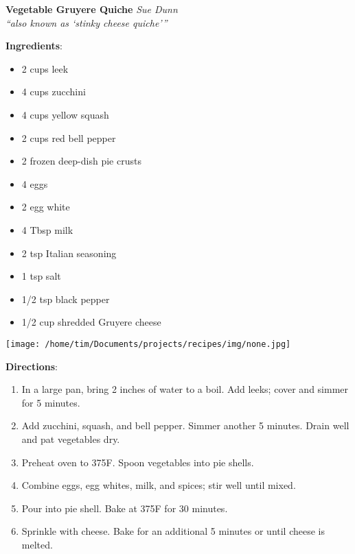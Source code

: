 \documentclass[11pt, twoside, openany]{book}
\begin{document}
\noindent\begin{minipage}[t]{\linewidth}%
{\Large\textbf{Vegetable Gruyere Quiche}} \label{vegetable-gruyere-quiche}\hfill\textit{Sue Dunn}\\
\textit{``also known as `stinky cheese quiche'''}\\
\noindent\begin{minipage}[t]{0.78\linewidth}%
\textbf{Ingredients}:\vspace{-3mm}
\begin{multicols}{2}
\begin{itemize}\setlength\itemsep{-1mm}
\item 2 cups leek
\item 4 cups zucchini
\item 4 cups yellow squash
\item 2 cups red bell pepper
\item 2 frozen deep-dish pie crusts
\item 4 eggs
\item 2 egg white
\item 4 Tbsp milk
\item 2 tsp Italian seasoning
\item 1 tsp salt
\item 1/2 tsp black pepper
\item 1/2 cup shredded Gruyere cheese
\end{itemize}
\end{multicols}
\end{minipage}
\noindent\begin{minipage}[t]{0.18\linewidth}
\centering \strut\vspace*{-\baselineskip}\newline
\texttt{[image: /home/tim/Documents/projects/recipes/img/none.jpg]}\\
\end{minipage}\vspace{3mm}
\textbf{Directions}:
\vspace{-3mm}\begin{enumerate}\setlength\itemsep{-1mm}
\item In a large pan, bring 2 inches of water to a boil. Add leeks; cover and simmer for 5 minutes.
\item Add zucchini, squash, and bell pepper. Simmer another 5 minutes. Drain well and pat vegetables dry.
\item Preheat oven to 375F. Spoon vegetables into pie shells.
\item Combine eggs, egg whites, milk, and spices; stir well until mixed.
\item Pour into pie shell. Bake at 375F for 30 minutes.
\item Sprinkle with cheese. Bake for an additional 5 minutes or until cheese is melted.
\end{enumerate}
\end{minipage}\vspace{8mm}
\end{document}
